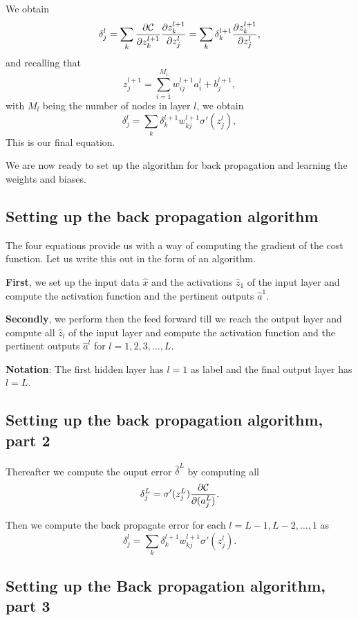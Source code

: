 \documentclass[%
oneside,                 %
final,                   %
10pt]{article}
\begin{document}
We obtain
\[
\delta_j^l =\sum_k \frac{\partial {\cal C}}{\partial z_k^{l+1}}\frac{\partial z_k^{l+1}}{\partial z_j^{l}}=\sum_k \delta_k^{l+1}\frac{\partial z_k^{l+1}}{\partial z_j^{l}},
\]
and recalling that
\[
z_j^{l+1} = \sum_{i=1}^{M_{l}}w_{ij}^{l+1}a_i^{l}+b_j^{l+1},
\]
with $M_l$ being the number of nodes in layer $l$, we obtain
\[
\delta_j^l =\sum_k \delta_k^{l+1}w_{kj}^{l+1}\sigma'(z_j^l),
\]
This is our final equation.

We are now ready to set up the algorithm for back propagation and learning the weights and biases.

\subsection{Setting up the back propagation algorithm}

The four equations  provide us with a way of computing the gradient of the cost function. Let us write this out in the form of an algorithm.

\textbf{First}, we set up the input data $\hat{x}$ and the activations
$\hat{z}_1$ of the input layer and compute the activation function and
the pertinent outputs $\hat{a}^1$.

\textbf{Secondly}, we perform then the feed forward till we reach the output
layer and compute all $\hat{z}_l$ of the input layer and compute the
activation function and the pertinent outputs $\hat{a}^l$ for
$l=1,2,3,\dots,L$.

\textbf{Notation}: The first hidden layer has $l=1$ as label and the final output layer has $l=L$.

\subsection{Setting up the back propagation algorithm, part 2}

Thereafter we compute the ouput error $\hat{\delta}^L$ by computing all
\[
\delta_j^L = \sigma'(z_j^L)\frac{\partial {\cal C}}{\partial (a_j^L)}.
\]

Then we compute the back propagate error for each $l=L-1,L-2,\dots,1$ as
\[
\delta_j^l = \sum_k \delta_k^{l+1}w_{kj}^{l+1}\sigma'(z_j^l).
\]

\subsection{Setting up the Back propagation algorithm, part 3}
\end{document}
